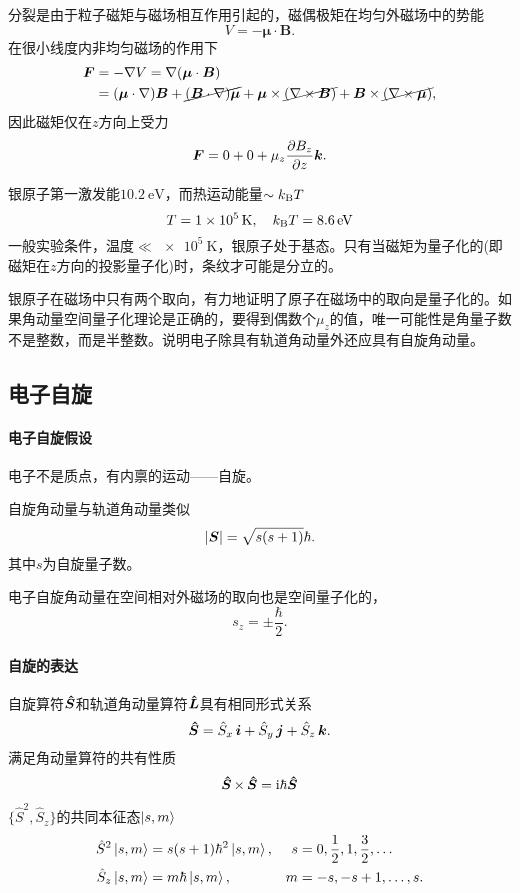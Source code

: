 分裂是由于粒子磁矩与磁场相互作用引起的，磁偶极矩在均匀外磁场中的势能
\[
V=-\bm\mu\cdot\bm B.
\]
在很小线度内非均匀磁场的作用下
\begin{align*}
	\bm F&=-\nabla V=\nabla(\bm\mu\cdot\bm B)\\
	&=(\bm\mu\cdot\nabla)\bm B+\cancel{(\bm B\cdot\nabla)\bm\mu}+\bm\mu\times\cancel{(\nabla\times\bm B)}+\bm B\times\cancel{(\nabla\times\bm\mu)},
\end{align*}
因此磁矩仅在$z$方向上受力
\[
	\bm F=0+0+\mu_z\frac{\partial^{\;\!\!}B_z}{\partial z^{\;\!\!}}\bm k.
\]

银原子第一激发能$\SI{10.2}\eV$，而热运动能量$\sim k_{\mathrm B} T$
\[
T=\SI{1e5}\K,\quad \kB T=\SI{8.6}\eV
\]
一般实验条件，温度$\ll\SI{e5}\K$，银原子处于基态。只有当磁矩为量子化的(即磁矩在$z$方向的投影量子化)时，条纹才可能是分立的。

银原子在磁场中只有两个取向，有力地证明了原子在磁场中的取向是量子化的。如果角动量空间量子化理论是正确的，要得到偶数个$\mu_z$的值，唯一可能性是角量子数不是整数，而是半整数。说明电子除具有轨道角动量外还应具有自旋角动量。

\subsection{电子自旋}
\paragraph*{电子自旋假设}
\begin{compactenum}
	\item 电子不是质点，有内禀的运动——自旋。%
	\item 自旋角动量与轨道角动量类似
		\[
		\left\lvert\bm S\right\rvert=\sqrt{s(s+1)}\hbar.
\]
		其中$s$为自旋量子数。
	\item 电子自旋角动量在空间相对外磁场的取向也是空间量子化的，
		\[
s_z=\pm\frac{\hbar}2.
\]
\end{compactenum}
\paragraph*{自旋的表达}自旋算符$\bm{\hat S}\!\mathop{}$和轨道角动量算符$\bm{\hat L}\!\mathop{}$具有相同形式关系
\[
	\bm{\hat S}\!\mathop{}=\hat S_x\,\bm i+\hat S_y\,\bm j+\hat S_z\,\bm k.
\]
满足角动量算符的共有性质
\begin{gather}
	\qo S\times\,\qo S=\i\hbar\qo S %
\end{gather}
$\{\hat S^2,\hat S_z\}$的共同本征态$\left\vert s,m\right\rangle$
\begin{align}
	\hat S^2\left\vert s,m\right\rangle&=s(s+1)\hbar^2\left\vert s,m\right\rangle,&s&=0,\frac12,1,\frac32,\ldots\\
	\hat S_z\left\vert s,m\right\rangle&=m\hbar\left\vert s,m\right\rangle,&m&=-s,-s+1,\ldots,s.
\end{align}
